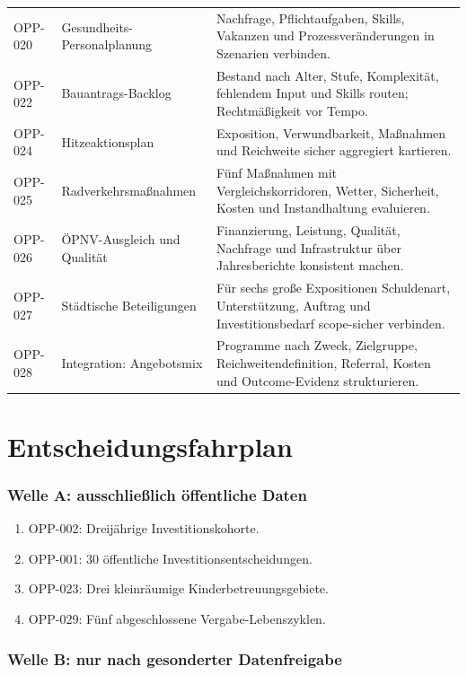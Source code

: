 \documentclass[11pt,a4paper]{article}
\begin{document}
\begin{longtable}{p{1.8cm}p{5.1cm}p{8cm}}
OPP-020 & Gesundheits-Personalplanung & Nachfrage, Pflichtaufgaben, Skills, Vakanzen und Prozessveränderungen in Szenarien verbinden. \\
OPP-022 & Bauantrags-Backlog & Bestand nach Alter, Stufe, Komplexität, fehlendem Input und Skills routen; Rechtmäßigkeit vor Tempo. \\
OPP-024 & Hitzeaktionsplan & Exposition, Verwundbarkeit, Maßnahmen und Reichweite sicher aggregiert kartieren. \\
OPP-025 & Radverkehrsmaßnahmen & Fünf Maßnahmen mit Vergleichskorridoren, Wetter, Sicherheit, Kosten und Instandhaltung evaluieren. \\
OPP-026 & ÖPNV-Ausgleich und Qualität & Finanzierung, Leistung, Qualität, Nachfrage und Infrastruktur über Jahresberichte konsistent machen. \\
OPP-027 & Städtische Beteiligungen & Für sechs große Expositionen Schuldenart, Unterstützung, Auftrag und Investitionsbedarf scope-sicher verbinden. \\
OPP-028 & Integration: Angebotsmix & Programme nach Zweck, Zielgruppe, Reichweitendefinition, Referral, Kosten und Outcome-Evidenz strukturieren. \\
\bottomrule
\end{longtable}

\part{Entscheidungsfahrplan}

\section{Welle A: ausschließlich öffentliche Daten}

\begin{enumerate}
  \item OPP-002: Dreijährige Investitionskohorte.
  \item OPP-001: 30 öffentliche Investitionsentscheidungen.
  \item OPP-023: Drei kleinräumige Kinderbetreuungsgebiete.
  \item OPP-029: Fünf abgeschlossene Vergabe-Lebenszyklen.
\end{enumerate}

\section{Welle B: nur nach gesonderter Datenfreigabe}
\end{document}
